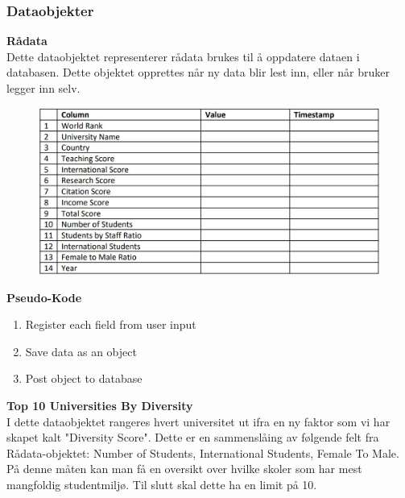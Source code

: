 \subsubsection{Dataobjekter}
\textbf{Rådata}\\
Dette dataobjektet representerer rådata brukes til å oppdatere dataen i databasen. Dette objektet 
opprettes når ny data blir lest inn, eller når bruker legger inn selv.

\FigureCounter
\begin{figure}[H]
  \includegraphics[width=\textwidth]{images/milepael4/rawObject.JPG}
\end{figure}

\textbf{Pseudo-Kode}
\begin{enumerate}
  \item Register each field from user input
  \item Save data as an object
  \item Post object to database
\end{enumerate}

\textbf{Top 10 Universities By Diversity}\\
I dette dataobjektet rangeres hvert universitet ut ifra en ny faktor som vi har skapet kalt "Diversity 
Score". Dette er en sammenslåing av følgende felt fra Rådata-objektet: Number of Students, 
International Students, Female To Male. På denne måten kan man få en oversikt over hvilke skoler 
som har mest mangfoldig studentmiljø. Til slutt skal dette ha en limit på 10.

